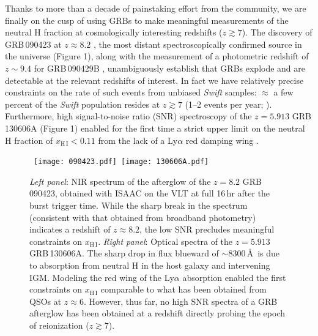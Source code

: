 \documentclass[letterpaper,11pt]{article}
\begin{document}
Thanks to more than a decade of painstaking effort from the community, we are finally
on the cusp of using GRBs to make meaningful measurements of the neutral H fraction 
at cosmologically interesting redshifts ($z \gtrsim 7$).  The discovery of 
GRB\,090423 at $z \approx 8.2$ \cite{tfl+09,sdc+09}, the most distant 
spectroscopically confirmed source in the universe (Figure 1), along with the 
measurement of a
photometric redshift of $z \sim 9.4$ for GRB\,090429B \cite{clf+11}, unambiguously
establish that GRBs explode and are detectable at the relevant redshifts of 
interest.  In fact we have relatively precise constraints 
on the rate of such events from unbiased \textit{Swift} samples: $\approx$ a few
percent of the \textit{Swift} population resides at $z \gtrsim 7$ (1--2 events per
year; \cite{pcb+09,gkk+11}).  Furthermore, high signal-to-noise ratio (SNR) 
spectroscopy of the $z = 5.913$ GRB\,130606A (Figure 1) enabled for the first time a 
strict upper limit on the neutral H fraction of $x_{\mathrm{H\,I}} < 0.11$ from 
the lack of a Ly$\alpha$ red damping wing \cite{cbf+13}.

\begin{figure}[tp!]
\begin{center}
\hbox{
\texttt{[image: 090423.pdf]}
\hspace{0.5cm}
\texttt{[image: 130606A.pdf]}
}
\end{center}
\caption{\footnotesize
{{\it Left panel}: NIR spectrum of the afterglow of the $z = 8.2$ 
GRB\,090423\cite{tfl+09}, obtained with ISAAC on the VLT at full 16\,hr
after the burst trigger time.  While the sharp break in the spectrum (consistent
with that obtained from broadband photometry) indicates a redshift of $z \approx
8.2$, the low SNR precludes meaningful constraints on $x_{\mathrm{H\,I}}$.
{\it Right panel}: Optical spectra of the $z = 5.913$ 
GRB\,130606A\cite{cbf+13}.  The sharp
drop in flux blueward of $\sim 8300$\,\AA\ is due to absorption from neutral H
in the host galaxy and intervening IGM.  Modeling the red wing of the Ly$\alpha$
absorption enabled the first constraints on $x_{\mathrm{H\,I}}$ 
comparable to what has been obtained
from QSOs at $z \approx 6$.  However, thus far, no high SNR spectra of a GRB
afterglow has been obtained at a redshift directly probing the epoch 
of reionization ($z \gtrsim 7$).}}
\label{fig1}
\end{figure}
\end{document}
